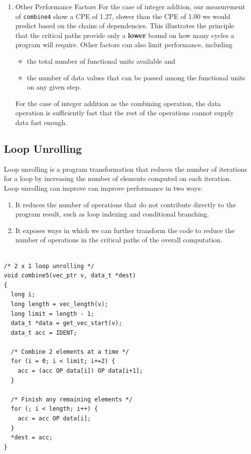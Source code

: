 \documentclass[11pt]{article}
\begin{document}
\begin{enumerate}
\item Other Performance Factors
\label{sec:orgd99aa38}
For the case of integer addtion, our measurement of \texttt{combine4} show a CPE of 1.27, slower than the CPE of 1.00 we would predict based on the chains of dependencies. This illustrates the principle that the critical paths provide only a \textbf{lower} bound on how many cycles a program will require. Other factors can also limit performance, including\\
\begin{itemize}
\item the total number of functional units available and\\
\item the number of data values that can be passed among the functional units on any given step.\\
\end{itemize}
For the case of integer addition as the combining operation, the data operation is sufficiently fast that the rest of the operations cannot supply data fast enough.\\
\end{enumerate}


\subsection{Loop Unrolling}
\label{sec:org4f17a75}
Loop unrolling is a program transformation that reduces the number of iterations for a loop by increasing the number of elements computed on each iteration. Loop unrolling can improve can improve performance in two ways:\\
\begin{enumerate}
\item It reduces the number of operations that do not contribute directly to the program result, such as loop indexing and conditional branching.\\
\item It exposes ways in which we can further transform the code to reduce the number of operations in the critical paths of the overall computation.\\
\end{enumerate}


\begin{verbatim}

/* 2 x 1 loop unrolling */
void combine5(vec_ptr v, data_t *dest)
{
  long i;
  long length = vec_length(v);
  long limit = length - 1;
  data_t *data = get_vec_start(v);
  data_t acc = IDENT;

  /* Combine 2 elements at a time */
  for (i = 0; i < limit; i+=2) {
    acc = (acc OP data[i]) OP data[i+1];
  }

  /* Finish any remaining elements */
  for (; i < length; i++) {
    acc = acc OP data[i];
  }
  *dest = acc;
}

\end{verbatim}
\end{document}
